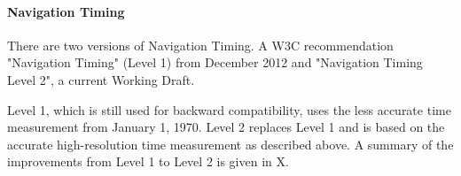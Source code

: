 




	








\paragraph{Navigation Timing} %


There are two versions of Navigation Timing.
A W3C recommendation "Navigation Timing" (Level 1) from December 2012 %
and "Navigation Timing Level 2", a current Working Draft. %

Level 1, which is still used for backward compatibility, uses the less accurate time measurement from January 1, 1970.
Level 2 replaces Level 1 and is based on the accurate high-resolution time measurement as described above.
A summary of the improvements from Level 1 to Level 2 is given in X. %


